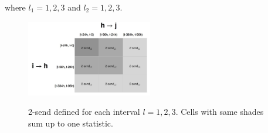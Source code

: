 \documentclass{article}
\begin{document}
 where $l_1=1,2,3$ and $l_2=1,2,3$. 
 \begin{figure}[ht]
 	\centering
 	\includegraphics[width=0.49\textwidth]{plots/triadtable.jpg} 
 	\label{fig:triadtable}
 	\caption{2-send defined for each interval $l=1,2,3$. Cells with same shades sum up to one statistic.}
 \end{figure}
 \fi



\end{document}
